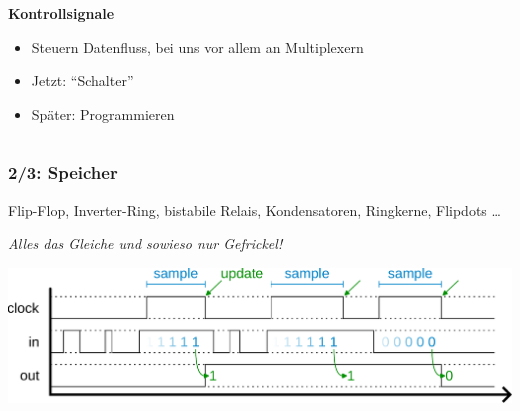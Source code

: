 \documentclass[t,aspectratio=169]{beamer}
\begin{document}
\begin{frame}
\begin{columns}[T]
\begin{column}{.45\textwidth}
      \bigskip

      \textbf{Kontrollsignale}

      \begin{itemize}
      \item Steuern Datenfluss, bei uns vor allem an Multiplexern
      \item Jetzt: \enquote{Schalter}
      \item Später: Programmieren
      \end{itemize}

      \bigskip

  \end{column}
  \end{columns}
\end{frame}

\begin{frame}
  \frametitle{2/3: Speicher}

  \begin{center}
    Flip-Flop, Inverter-Ring, bistabile Relais, Kondensatoren, Ringkerne, Flipdots \ldots

    \textit{Alles das Gleiche und sowieso nur Gefrickel!}
  \end{center}

  \bigskip

  \includegraphics[width=\linewidth]{reg-waveform.pdf}
\end{frame}
\end{document}
